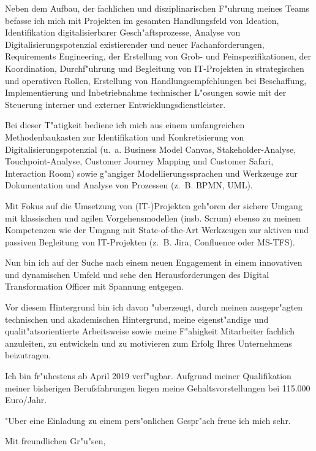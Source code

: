 \documentclass[10pt,a4paper]{dinbrief}
\begin{document}
\begin{letter}
Neben dem Aufbau, der fachlichen und disziplinarischen F"uhrung meines Teams befasse ich mich  mit Projekten im gesamten Handlungsfeld von Ideation, Identifikation digitalisierbarer Gesch"afts\-prozesse, Analyse von Digitalisierungspotenzial existierender und neuer Fachanforderungen, Requirements Engineering, der Erstellung von Grob- und Feinspezifikationen, der Koordination, Durchf"uhrung und Begleitung von IT-Projekten in strategischen und operativen Rollen, Erstellung von Handlungsempfehlungen bei Beschaffung, Implementierung und Inbetriebnahme technischer L"osungen sowie mit der Steuerung interner und externer Entwicklungsdienstleister. 

Bei dieser T"atigkeit bediene ich mich aus einem umfangreichen Methodenbaukasten zur Identifikation und Konkretisierung von Digitalisierungspotenzial (u.~a. Business Model Canvas, Stakeholder-Analyse, Touchpoint-Analyse, Customer Journey Mapping und Customer Safari, Interaction Room) sowie g"angiger Modellierungssprachen und Werkzeuge zur Dokumentation und Analyse von Prozessen (z.~B. BPMN, UML).

Mit Fokus auf die Umsetzung von (IT-)Projekten geh"oren der sichere Umgang mit klassischen und agilen Vorgehensmodellen (insb. Scrum) ebenso zu meinen Kompetenzen wie der Umgang mit State-of-the-Art Werkzeugen zur aktiven und passiven Begleitung von IT-Projekten (z.~B. Jira, Confluence oder MS-TFS).

Nun bin ich auf der Suche nach einem neuen Engagement in einem innovativen und dynamischen Umfeld und sehe den Herausforderungen des Digital Transformation Officer mit Spannung entgegen.

Vor diesem Hintergrund bin ich davon "uberzeugt, durch meinen ausgepr"agten technischen und akademischen Hintergrund, meine eigenst"andige und qualit"atsorientierte Arbeitsweise sowie meine F"ahigkeit Mitarbeiter fachlich anzuleiten, zu entwickeln und zu motivieren zum Erfolg Ihres Unternehmens beizutragen.

Ich bin fr"uhestens ab April 2019 verf"ugbar. Aufgrund meiner Qualifikation meiner bisherigen Berufsfahrungen liegen meine Gehaltsvorstellungen bei 115.000 Euro/Jahr. 

"Uber eine Einladung zu einem pers"onlichen Gespr"ach freue ich mich sehr.

\closing{Mit freundlichen Gr"u"sen,}
\end{letter}
\end{document}
